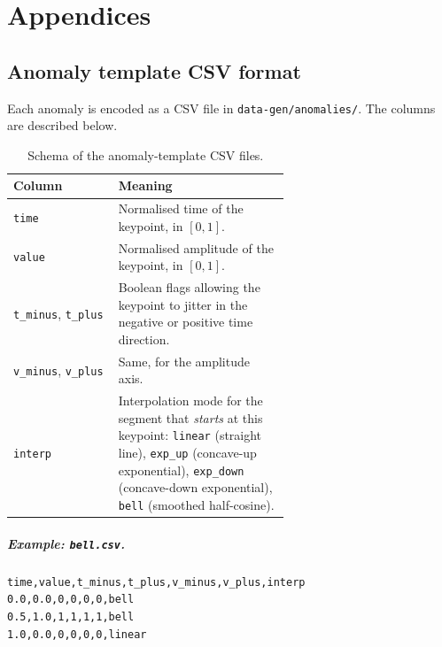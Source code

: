 \appendix
\chapter{Appendices}
\label{chap:appendix}

\section{Anomaly template CSV format}
\label{app:csv-format}

Each anomaly is encoded as a CSV file in
\texttt{data-gen/anomalies/}. The columns are described below.

\begin{table}[H]
    \centering
    \footnotesize
    \begin{tabular}{lp{0.62\linewidth}}
        \toprule
        Column & Meaning \\
        \midrule
        \texttt{time}    & Normalised time of the keypoint, in $[0, 1]$. \\
        \texttt{value}   & Normalised amplitude of the keypoint, in $[0, 1]$. \\
        \texttt{t\_minus}, \texttt{t\_plus} & Boolean flags allowing
        the keypoint to jitter in the negative or positive time direction. \\
        \texttt{v\_minus}, \texttt{v\_plus} & Same, for the amplitude axis. \\
        \texttt{interp}  & Interpolation mode for the segment that
        \emph{starts} at this keypoint:
        \texttt{linear} (straight line),
        \texttt{exp\_up} (concave-up exponential),
        \texttt{exp\_down} (concave-down exponential),
        \texttt{bell} (smoothed half-cosine). \\
        \bottomrule
    \end{tabular}
    \caption{Schema of the anomaly-template CSV files.}
    \label{tab:csv-schema}
\end{table}

\paragraph{Example: \texttt{bell.csv}.}
\begin{lstlisting}[caption={Encoding of the \texttt{bell} template.}, label={lst:bell-csv}]
time,value,t_minus,t_plus,v_minus,v_plus,interp
0.0,0.0,0,0,0,0,bell
0.5,1.0,1,1,1,1,bell
1.0,0.0,0,0,0,0,linear
\end{lstlisting}

